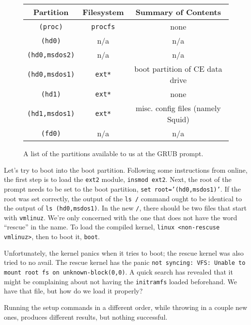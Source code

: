 \documentclass[12pt]{article}
\begin{document}
\begin{figure}[H]
  \label{tab:grubPartitions}
  \caption{A list of the partitions available to us at the GRUB prompt.}
  \begin{center}
    \begin{tabular}{|c|c|c|}
      \hline
      Partition & Filesystem & Summary of Contents \\
      \hline
      {\tt (proc)} & {\tt procfs} & none \\
      {\tt (hd0)} & n/a & n/a \\
      {\tt (hd0,msdos2)} & n/a & n/a \\
      {\tt (hd0,msdos1)} & {\tt ext*} & boot partition of CE data drive \\
      {\tt (hd1)} & {\tt ext*} & none \\
      {\tt (hd1,msdos1)} & {\tt ext*} & misc. config files (namely Squid) \\
      {\tt (fd0)} & n/a & n/a \\
      \hline
    \end{tabular}
  \end{center}
\end{figure}

\qq Let's try to boot into the boot partition. Following some instructions from
online, the first step is to load the {\tt ext2} module, {\tt insmod
  ext2}. Next, the root of the prompt needs to be set to the boot partition,
{\tt set root='(hd0,msdos1)'}. If the root was set correctly, the output of the
{\tt ls /} command ought to be identical to the output of {\tt ls
  (hd0,msdos1)}. In the new {\tt /}, there should be two files that start with
{\tt vmlinuz}. We're only concerned with the one that does not have the word
``rescue'' in the name. To load the compiled kernel, {\tt linux <non-rescuse
  vmlinuz>}, then to boot it, {\tt boot}.

\qq Unfortunately, the kernel panics when it tries to boot; the rescue
kernel was also tried to no avail. The rescue kernel has the panic {\tt not
syncing: VFS: Unable to mount root fs on unknown-block(0,0)}. A quick search has
revealed that it might be complaining about not having the {\tt initramfs}
loaded beforehand. We have that file, but how do we load it properly?

\qq Running the setup commands in a different order, while throwing in a couple
new ones, produces different results, but nothing successful.
\end{document}
